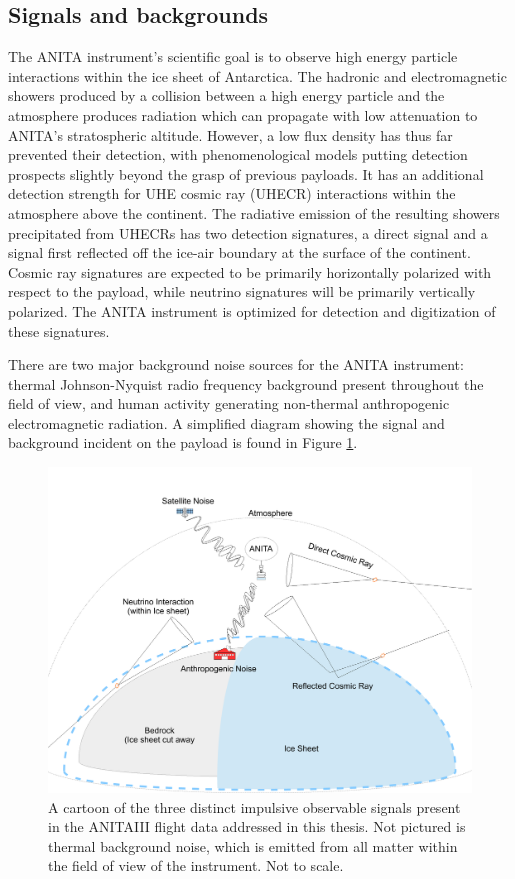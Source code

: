 	\subsection{Signals and backgrounds}
	\label{sec:SignalsAndBackgrounds}
	The ANITA instrument's scientific goal is to observe high energy particle interactions within the ice sheet of Antarctica.  The hadronic and electromagnetic showers produced by a collision between a high energy particle and the atmosphere produces radiation which can propagate with low attenuation to ANITA's stratospheric altitude. However, a low flux density has thus far prevented their detection, with phenomenological models putting detection prospects slightly beyond the grasp of previous payloads.  It has an additional detection strength for UHE cosmic ray (UHECR) interactions within the atmosphere above the continent.  The radiative emission of the resulting showers precipitated from UHECRs has two detection signatures, a direct signal and a signal first reflected off the ice-air boundary at the surface of the continent.  Cosmic ray signatures are expected to be primarily horizontally polarized with respect to the payload, while neutrino signatures will be primarily vertically polarized.  The ANITA instrument is optimized for detection and digitization of these signatures.
	
	There are two major background noise sources for the ANITA instrument: thermal Johnson-Nyquist radio frequency background present throughout the field of view, and human activity generating non-thermal anthropogenic electromagnetic radiation.  A simplified diagram showing the signal and background incident on the payload is found in Figure \ref{fig:AnitaInFlightObservable}.
	
\begin{figure}
\centering
	\includegraphics[width=\textwidth]{figures/AnitaInFlightObservable2}
	\caption{A cartoon of the three distinct impulsive observable signals present in the ANITAIII flight data addressed in this thesis. Not pictured is thermal background noise, which is emitted from all matter within the field of view of the instrument.  Not to scale. }
	\label{fig:AnitaInFlightObservable}
\end{figure}	

